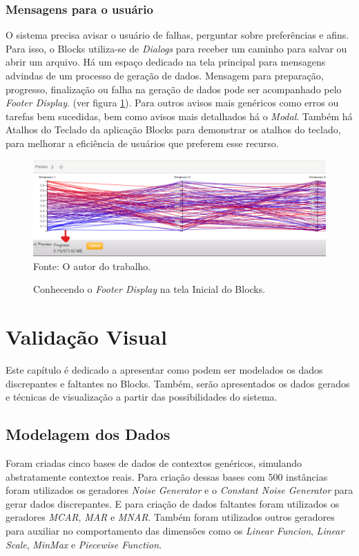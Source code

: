 \documentclass[
	12pt,				%
	openright,			%
	oneside,			%
	a4paper,			%
	english,			%
	brazil				%
	]{abntex2}
\begin{document}
		\subsection{Mensagens para o usuário}
			O sistema precisa avisar o usuário de falhas, perguntar sobre preferências e afins.
			Para isso, o Blocks utiliza-se de \emph{Dialogs} para receber um caminho para salvar ou abrir um arquivo.
			Há um espaço dedicado na tela principal para mensagens advindas de um processo de geração de dados.
			Mensagem para preparação, progresso, finalização ou falha na geração de dados pode ser acompanhado pelo \emph{Footer Display}. (ver figura \ref{fig:SDvisor}).
			Para outros avisos mais genéricos como erros ou tarefas bem sucedidas, bem como avisos mais detalhados há o \emph{Modal}.
			Também há Atalhos do Teclado da aplicação Blocks para demonstrar os atalhos do teclado, para melhorar a eficiência de usuários que preferem esse recurso.
			\begin{figure}[h]
				\centering
				\caption{Conhecendo o \emph{Footer Display} na tela Inicial do Blocks.}
				\includegraphics[width=\linewidth]{./figures/prototipo/SDvisor.png}
				\label{fig:SDvisor}
				\footnotesize Fonte: O autor do trabalho.
			\end{figure}

\chapter{Validação Visual}
	Este capítulo é dedicado a apresentar como podem ser modelados os dados discrepantes e faltantes no Blocks.
	Também, serão apresentados os dados gerados e técnicas de visualização a partir das possibilidades do sistema.
	\par
	
	\section{Modelagem dos Dados}

		Foram criadas cinco bases de dados de contextos genéricos, simulando abstratamente contextos reais.
		Para criação dessas bases com 500 instâncias foram utilizados os geradores
		 \emph{Noise Generator} e o \emph{Constant Noise Generator} para gerar dados discrepantes.
		E para criação de dados faltantes foram utilizados os geradores
		 \emph{MCAR}, \emph{MAR} e \emph{MNAR}.
		Também foram utilizados outros geradores para auxiliar no comportamento das dimensões como os
		 \emph{Linear Funcion}, \emph{Linear Scale}, \emph{MinMax} e 
		 \emph{Piecewise Function}.
		\par
\end{document}
